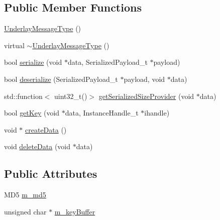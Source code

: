 \subsection*{Public Member Functions}
\begin{DoxyCompactItemize}
\item 
\hyperlink{classapollo_1_1cyber_1_1transport_1_1UnderlayMessageType_a00d06a38a4b9dc8979b48123ee70affc}{Underlay\-Message\-Type} ()
\item 
virtual \hyperlink{classapollo_1_1cyber_1_1transport_1_1UnderlayMessageType_ac092329df3cf792ffaaf80028b34df04}{$\sim$\-Underlay\-Message\-Type} ()
\item 
bool \hyperlink{classapollo_1_1cyber_1_1transport_1_1UnderlayMessageType_aa3a5b3cd4ac16b879e600d4652ce9d01}{serialize} (void $\ast$data, Serialized\-Payload\-\_\-t $\ast$payload)
\item 
bool \hyperlink{classapollo_1_1cyber_1_1transport_1_1UnderlayMessageType_addcc30ac149aae4fd099e808a809cc58}{deserialize} (Serialized\-Payload\-\_\-t $\ast$payload, void $\ast$data)
\item 
std\-::function$<$ uint32\-\_\-t()$>$ \hyperlink{classapollo_1_1cyber_1_1transport_1_1UnderlayMessageType_a1a02a21f0d7bc7148f7d24e39e7a6c0e}{get\-Serialized\-Size\-Provider} (void $\ast$data)
\item 
bool \hyperlink{classapollo_1_1cyber_1_1transport_1_1UnderlayMessageType_a5a4bb79093137ddfe93e27ba5b3a336a}{get\-Key} (void $\ast$data, Instance\-Handle\-\_\-t $\ast$ihandle)
\item 
void $\ast$ \hyperlink{classapollo_1_1cyber_1_1transport_1_1UnderlayMessageType_ae20e71f5cca39feac6993ef26fc89abf}{create\-Data} ()
\item 
void \hyperlink{classapollo_1_1cyber_1_1transport_1_1UnderlayMessageType_aa406d69101f4f1d0aec4de5f13f54e56}{delete\-Data} (void $\ast$data)
\end{DoxyCompactItemize}
\subsection*{Public Attributes}
\begin{DoxyCompactItemize}
\item 
M\-D5 \hyperlink{classapollo_1_1cyber_1_1transport_1_1UnderlayMessageType_ad0c794c245214421d0a93f1c9df6ca03}{m\-\_\-md5}
\item 
unsigned char $\ast$ \hyperlink{classapollo_1_1cyber_1_1transport_1_1UnderlayMessageType_a70946fdd8679f584bb8bd917cc845a21}{m\-\_\-key\-Buffer}
\end{DoxyCompactItemize}


